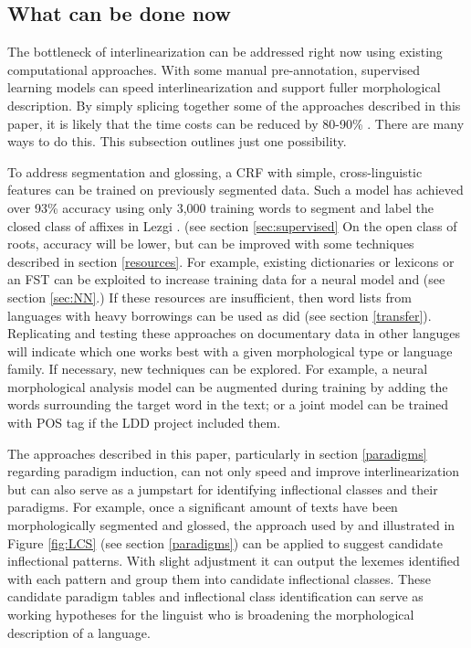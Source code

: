 \documentclass[12pt]{article}
\begin{document}
\subsection{What can be done now}
\label{sec:splicing}
The bottleneck of interlinearization can be addressed right now using existing computational approaches. With some manual pre-annotation, supervised learning models can speed interlinearization and support fuller morphological description. By simply splicing together some of the approaches described in this paper, it is likely that the time costs can be reduced by 80-90\% \cite{moeller_automatic_2018}. There are many ways to do this. This subsection outlines just one possibility.

To address segmentation and glossing, a CRF with simple, cross-linguistic features can be trained on previously segmented data. Such a model has achieved over 93\% accuracy using only 3,000 training words to segment and label the closed class of affixes in Lezgi \cite{moeller_automatic_2018}. (see section \ref{sec:supervised} On the open class of roots, accuracy will be lower, but can be improved with some techniques described in section \ref{resources}. For example, existing dictionaries or lexicons or an FST can be exploited to increase training data for a neural model  and  (see section \ref{sec:NN}.) If these resources are insufficient, then word lists from languages with heavy borrowings can be used as  did (see section \ref{transfer}). Replicating and testing these approaches on documentary data in other languges will indicate which one works best with a given morphological type or language family. If necessary, new techniques can be explored. For example, a neural morphological analysis model can be augmented during training by adding the words surrounding the target word in the text; or a joint model can be trained with POS tag if the LDD project included them.

The  approaches described in this paper, particularly in section \ref{paradigms} regarding paradigm induction, can not only speed and improve interlinearization but can also serve as a jumpstart for identifying inflectional classes and their paradigms. For example, once a significant amount of texts have been morphologically segmented and glossed, the approach used by  and illustrated in Figure \ref{fig:LCS} (see section \ref{paradigms}) can be applied to suggest candidate inflectional patterns. With slight adjustment it can output the lexemes identified with each pattern and group them into candidate inflectional classes. These candidate paradigm tables and inflectional class identification can serve as working hypotheses for the linguist who is broadening the morphological description of a language.
\end{document}
